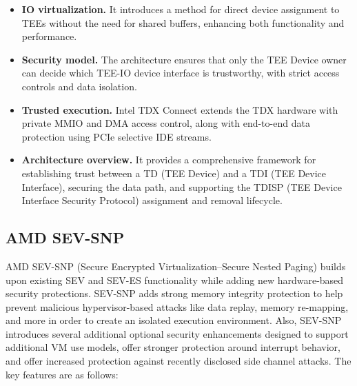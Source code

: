 \documentclass[lang=en]{sjtuarticle}
\begin{document}
\begin{itemize}
    \item \textbf{IO virtualization.} It introduces a method for direct device assignment to TEEs without the need for shared buffers, enhancing both functionality and performance.

    \item \textbf{Security model.} The architecture ensures that only the TEE Device owner can decide which TEE-IO device interface is trustworthy, with strict access controls and data isolation.
    
    \item \textbf{Trusted execution.} Intel TDX Connect extends the TDX hardware with private MMIO and DMA access control, along with end-to-end data protection using PCIe selective IDE streams.
    
    \item \textbf{Architecture overview.} It provides a comprehensive framework for establishing trust between a TD (TEE Device) and a TDI (TEE Device Interface), securing the data path, and supporting the TDISP (TEE Device Interface Security Protocol) assignment and removal lifecycle.
\end{itemize}

\subsection{AMD SEV-SNP}

AMD SEV-SNP (Secure Encrypted Virtualization--Secure Nested Paging) \cite{snp} builds upon existing SEV and SEV-ES functionality while adding new hardware-based security 
protections. SEV-SNP adds strong memory integrity protection to help prevent malicious hypervisor-based attacks like data replay, memory re-mapping, and more in order to create an isolated execution 
environment. Also, SEV-SNP introduces several additional optional security enhancements designed to 
support additional VM use models, offer stronger protection around interrupt behavior, and offer 
increased protection against recently disclosed side channel attacks. The key features are as follows:
\end{document}
